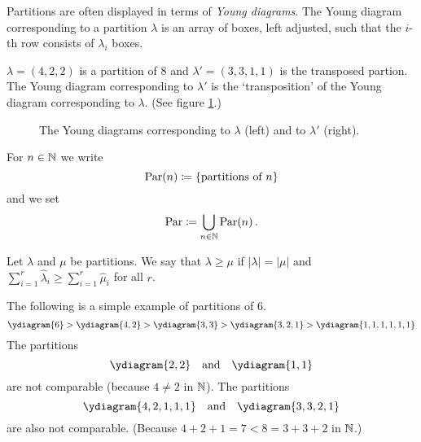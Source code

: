 Partitions are often displayed in terms of \emph{Young diagrams}.
The Young diagram corresponding to a partition $\lambda$ is an array of boxes, left adjusted, such that the $i$-th row consists of $\lambda_i$ boxes.


\begin{example}
  $\lambda = (4,2,2)$ is a partition of $8$ and $\lambda' = (3,3,1,1)$ is the transposed partion.
  The Young diagram corresponding to $\lambda'$ is the `transposition' of the Young diagram corresponding to $\lambda$.
  (See figure \ref{figure: Young diagram example}.)
  \begin{figure}
    \centering
    \qquad
    \caption{The Young diagrams corresponding to $\lambda$ (left) and to $\lambda'$ (right).}
    \label{figure: Young diagram example}
  \end{figure}
\end{example}


\begin{definition}
  For $n \in \mathbb{N}$ we write
  \[
              \operatorname{Par}(n)
    \coloneqq \{\text{partitions of $n$}\}
  \]
  and we set
  \[
              \operatorname{Par}
    \coloneqq \bigcup_{n \in \mathbb{N}} \operatorname{Par}(n) \,.
  \]
\end{definition}
  

\begin{definition}
  Let $\lambda$ and $\mu$ be partitions.
  We say that $\lambda \geq \mu$ if $|\lambda| = |\mu|$ and $\sum_{i=1}^r \hat{\lambda}_i \geq \sum_{i=1}^r \hat{\mu}_i$ for all $r$.
\end{definition}


\begin{example}
  The following is a simple example of partitions of $6$.
  \[
      \ydiagram{6}
    > \ydiagram{4,2}
    > \ydiagram{3,3}
    > \ydiagram{3,2,1}
    > \ydiagram{1,1,1,1,1,1}
  \]
  The partitions
  \[
    \ydiagram{2,2}
    \quad \text{and} \quad
    \ydiagram{1,1}
  \]
  are not comparable (because $4 \neq 2$ in $\mathbb{N}$). The partitions
  \[
    \ydiagram{4,2,1,1,1}
    \quad \text{and} \quad
    \ydiagram{3,3,2,1}
  \]
  are also not comparable.
  (Because $4+2+1 = 7 < 8 = 3+3+2$ in $\mathbb{N}$.)
\end{example}

